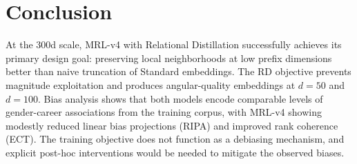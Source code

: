 \documentclass[11pt,a4paper]{article}
\begin{document}
\section{Conclusion}

At the 300d scale, MRL-v4 with Relational Distillation successfully achieves its primary design goal: preserving local neighborhoods at low prefix dimensions better than naive truncation of Standard embeddings. The RD objective prevents magnitude exploitation and produces angular-quality embeddings at $d=50$ and $d=100$. Bias analysis shows that both models encode comparable levels of gender-career associations from the training corpus, with MRL-v4 showing modestly reduced linear bias projections (RIPA) and improved rank coherence (ECT). The training objective does not function as a debiasing mechanism, and explicit post-hoc interventions would be needed to mitigate the observed biases.
\end{document}
